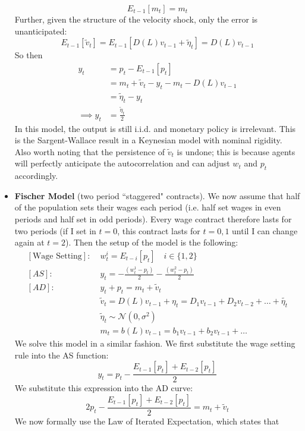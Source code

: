 \documentclass[12pt]{article}
\begin{document}
\begin{itemize}
    \[E_{t-1}[m_t] = m_t\]
    Further, given the structure of the velocity shock, only the error is unanticipated:
    \[E_{t-1}[\widetilde{v}_t] = E_{t-1}[D(L)v_{t-1} + \widetilde{\eta}_t] = D(L)v_{t-1}\]
    So then 
    \[\begin{split}
        y_t &= p_t - E_{t-1}[p_t] \\
        &= m_t + \widetilde{v}_t - y_t - m_t - D(L)v_{t-1} \\
        &= \widetilde{\eta}_t - y_t \\
        \implies y_t &= \frac{\widetilde{\eta}_t}{2}
    \end{split}\]
    In this model, the output is still i.i.d. and monetary policy is irrelevant. This is the Sargent-Wallace result in a Keynesian model with nominal rigidity. Also worth noting that the persistence of $\widetilde{v}_t$ is undone; this is because agents will perfectly anticipate the autocorrelation and can adjust $w_t$ and $p_t$ accordingly.
    \item \textbf{Fischer Model} (two period ``staggered" contracts). We now assume that half of the population sets their wages each period (i.e. half set wages in even periods and half set in odd periods). Every wage contract therefore lasts for two periods (if I set in $t=0$, this contract lasts for $t=0,1$ until I can change again at $t=2$). Then the setup of the model is the following:
     \[\begin{split}
        [\text{Wage Setting}]:&\; w_t^i = E_{t-i}[p_t] \quad i \in \{1,2\} \\
        [AS]:&\; y_t = -\frac{(w_t^1 -p_t)}{2} - \frac{(w_t^2 -p_t)}{2} \\
        [AD]:&\; y_t + p_t = m_t + \widetilde{v}_t \\
        &\; \widetilde{v}_t = D(L)v_{t-1} + \eta_t = D_1v_{t-1} + D_2v_{t-2} + \hdots + \widetilde{\eta_t} \\
        &\; \widetilde{\eta}_t \sim \mathcal{N}\left(0, \sigma^2\right) \\
        &\; m_t = b(L)v_{t-1} = b_1v_{t-1} + b_2v_{t-1} + \hdots
    \end{split}\]
    We solve this model in a similar fashion. We first substitute the wage setting rule into the AS function:
    \[y_t = p_t - \frac{E_{t-1}[p_t] + E_{t-2}[p_t]}{2}\]
    We substitute this expression into the AD curve:
    \[2p_t - \frac{E_{t-1}[p_t] + E_{t-2}[p_t]}{2} = m_t + \widetilde{v}_t\]
    We now formally use the Law of Iterated Expectation, which states that
    \begin{equation}\label{Law of Iterated Expectation}

\end{equation}
\end{itemize}
\end{document}
